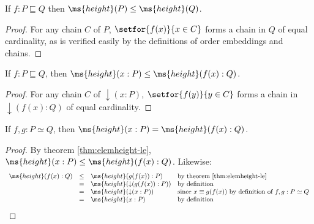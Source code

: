\documentclass{article}
\newcommand{\ale}{\sqsubseteq}
\newcommand{\ordle}{\ale}
\newcommand{\ordeq}{\simeq}
\newcommand{\height}{\ms{height}}
\newcommand{\elemheight}[2]{\height(#2 : #1)}
\newcommand{\down}[2]{\mathop{\downarrow}(#2 : #1)}
\begin{document}


\begin{theorem}\label{thm:height-le}
  If $f : P \ale Q$ then $\height(P) \le \height(Q)$.
\end{theorem}
\begin{proof}
  For any chain $C$ of $P$, $\setfor{f(x)}{x \in C}$ forms a chain in $Q$ of
  equal cardinality, as is verified easily by the definitions of order
  embeddings and chains.
\end{proof}

\begin{theorem}
  \label{thm:elemheight-le}
  If $f : P \ordle Q$, then $\elemheight{P}{x} \le \elemheight{Q}{f(x)}$.
\end{theorem}
\begin{proof}
  For any chain $C$ of $\down{P}{x}$, $\setfor{f(y)}{y \in C}$ forms a chain in
  $\down{Q}{f(x)}$ of equal cardinality.
\end{proof}

\begin{theorem}
  If $f,g : P \ordeq Q$, then $\elemheight{P}{x} = \elemheight{Q}{f(x)}$.
\end{theorem}
\begin{proof}
  By theorem \ref{thm:elemheight-le}, $\elemheight{P}{x} \le
  \elemheight{Q}{f(x)}$. Likewise:
  \[
  \begin{array}{rcll}
    \elemheight{Q}{f(x)}
    &\le& \elemheight{P}{g(f(x))} & \text{by theorem \ref{thm:elemheight-le}}\\
    &=& \height(\down{P}{g(f(x))}) & \text{by definition}\\
    &=& \height(\down{P}{x})
    & \text{since}~x \equiv g(f(x))~\text{by definition of}~f,g : P \ordeq Q\\
    &=& \elemheight{P}{x} & \text{by definition}
  \end{array}
  \]
\end{proof}
\end{document}
